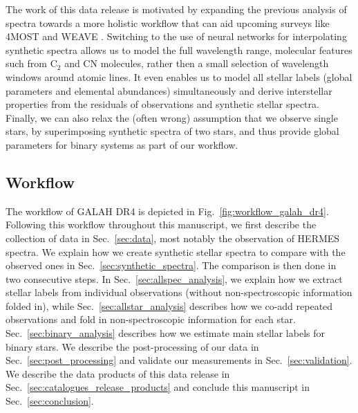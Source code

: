 \documentclass[
  journal=pasa,
  manuscript=research-paper, %
  year=2023,
  volume=37
]{cup-journal}
\begin{document}
The work of this data release is motivated by expanding the previous analysis of spectra towards a more holistic workflow that can aid upcoming surveys like 4MOST \citep{4MOST2019} and WEAVE \citep{Dalton2014}. Switching to the use of neural networks for interpolating synthetic spectra allows us to model the full wavelength range, molecular features such from $\mathrm{C_2}$ and CN molecules, rather then a small selection of wavelength windows around atomic lines. It even enables us to model all stellar labels (global parameters and elemental abundances) simultaneously and derive interstellar properties from the residuals of observations and synthetic stellar spectra. Finally, we can also relax the (often wrong) assumption that we observe single stars, by superimposing synthetic spectra of two stars, and thus provide global parameters for binary systems as part of our workflow.

\subsection{Workflow} \label{sec:workflow}

The workflow of GALAH DR4 is depicted in Fig.~\ref{fig:workflow_galah_dr4}. Following this workflow throughout this manuscript, we first describe the collection of data in Sec.~\ref{sec:data}, most notably the observation of HERMES spectra. We explain how we create synthetic stellar spectra to compare with the observed ones in Sec.~\ref{sec:synthetic_spectra}. The comparison is then done in two consecutive steps. In Sec.~\ref{sec:allspec_analysis}, we explain how we extract stellar labels from individual observations (without non-spectroscopic information folded in), while Sec.~\ref{sec:allstar_analysis} describes how we co-add repeated observations and fold in non-spectroscopic information for each star. Sec.~\ref{sec:binary_analysis} describes how we estimate main stellar labels for binary stars. We describe the post-processing of our data in Sec.~\ref{sec:post_processing} and validate our measurements in Sec.~\ref{sec:validation}. We describe the data products of this data release in Sec.~\ref{sec:catalogues_release_products} and conclude this manuscript in Sec.~\ref{sec:conclusion}.
\end{document}
